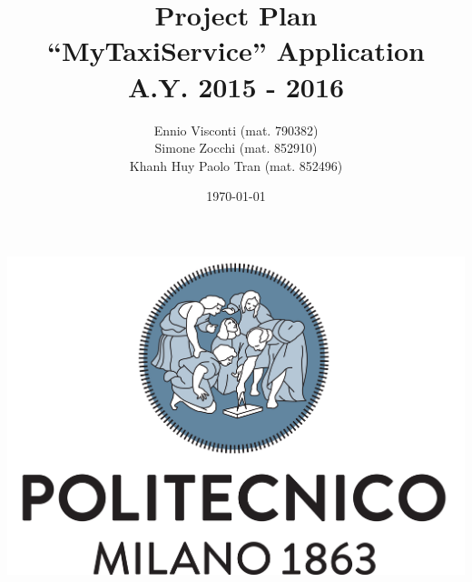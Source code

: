\documentclass{article}
\title{ Project Plan  
\\ ``MyTaxiService'' Application
\\ A.Y. 2015 - 2016 }
\author{Ennio Visconti (mat. 790382)
\\ Simone Zocchi (mat. 852910)
\\ Khanh Huy Paolo Tran (mat. 852496)}
\date{\today}
\begin{document}
   
    \begin{titlepage}
        \maketitle 
        \vfill
        \centerline{\includegraphics[scale=0.5]{LogoPolimi}}
        \vfill
        \vfill
    \end{titlepage}

        
    \tableofcontents












\end{document}
